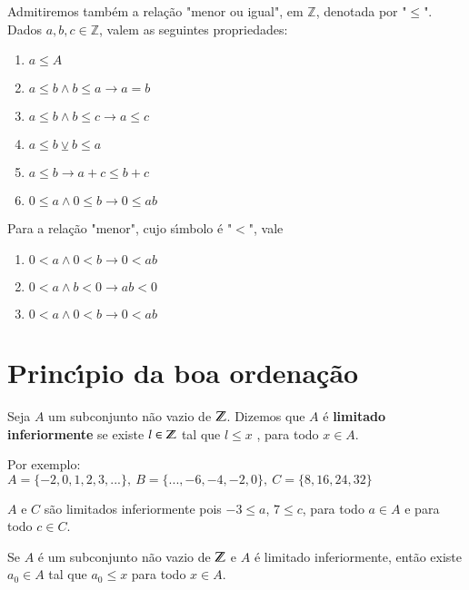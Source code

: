 Admitiremos tamb{\'e}m a rela{\c c}{\~a}o "menor ou igual", em $\mathbb{Z}$, denotada por "$\leq$". Dados $a,b,c\in\mathbb{Z}$, valem as seguintes propriedades:
\begin{enumerate}
\item $a\leq A$
\item $a\leq b\wedge b\leq a\rightarrow a=b$
\item $a\leq b\wedge b\leq c\rightarrow a\leq c$
\item $a\leq b\veebar b\leq a$
\item $a\leq b\rightarrow a+c\leq b+c$
\item $0\leq a\wedge 0\leq b\rightarrow 0\leq ab$
\end{enumerate}

Para a rela{\c c}{\~a}o "menor", cujo s{\'\i}mbolo {\'e} "$<$", vale
\begin{enumerate}
\item $0<a\wedge 0<b\rightarrow 0<ab$
\item $0<a\wedge b<0\rightarrow ab<0$
\item $0<a\wedge 0<b\rightarrow 0<ab$
\end{enumerate}

\section{Princ{\'\i}pio da boa ordena{\c c}{\~a}o}

\begin{definicao} 
	Seja $A$ um subconjunto n{\~a}o vazio de $\mathbb{Z}$. Dizemos que $A$ {\'e} \textbf{limitado inferiormente} se existe $l \in \mathbb{Z}$ tal que $l \leq x$
	, para todo $x\in A$.
\end{definicao}

Por exemplo:\\
$A=\{-2,0,1,2,3,...\},\ B=\{...,-6,-4,-2,0\},\ C=\{8,16,24,32\}$

$A$ e $C$ s{\~a}o limitados inferiormente pois $-3\leq a$, $7\leq c$, para todo $a\in A$ e para todo $c\in C$.

\begin{definicao}
	Se $A$ {\'e} um subconjunto n{\~a}o vazio de $\mathbb{Z}$ e $A$ {\'e} limitado inferiormente, ent{\~a}o existe $a_{0}\in A$ tal que $a_{0}\leq x$ para todo $x\in A$.
\end{definicao}

